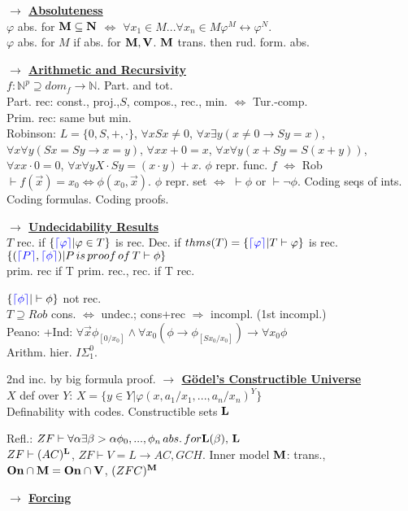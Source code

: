 \documentclass[9pt]{article}
\newcommand{\class}[1]{{\bf #1}}
\newcommand{\N}{\mathbb{N}}
\newcommand{\code}[1]{{\color{blue}\lceil#1\rceil}}
\newcommand{\mytitle}[1]{ {\bf $\rightarrow$ \underline{#1}}\\}
\begin{document}
\begin{multicols*}{2}
\mytitle{Absoluteness}
$\varphi$ abs. for $\class{M}\subseteq\class{N}$ $\Leftrightarrow$ $\forall x_1\in M...\forall x_n\in M \varphi^M\leftrightarrow\varphi^N$.\\
$\varphi$ abs. for $M$ if abs. for $\class{M}, \class{V}$.
$\class{M}$ trans. then rud. form. abs.

\mytitle{Arithmetic and Recursivity}
$f\colon \N^p\supseteq dom_f\to \N$. Part. and tot.\\
Part. rec: const., proj.,$S$, compos., rec., min. $\Leftrightarrow$ Tur.-comp.\\
Prim. rec: same but min.\\
Robinson: $L=\{0,S,+,\cdot\}$, $\forall x Sx\neq 0$, $\forall x\exists y (x\neq 0\to Sy=x)$, $\forall x \forall y (Sx=Sy\to x=y)$, $\forall x x+0=x$, $\forall x\forall y (x+Sy=S(x+y))$, $\forall x x\cdot 0=0$, $\forall x\forall y X\cdot Sy=(x\cdot y)+x$.
$\phi$ repr. func. $f$ $\Leftrightarrow$ Rob$\vdash f(\vec{x})=x_0\Leftrightarrow\phi(x_0,\vec{x})$. $\phi$ repr. set $\Leftrightarrow$ $\vdash\phi$ or $\vdash\neg\phi$. Coding seqs of ints. Coding formulas. Coding proofs.

\mytitle{Undecidability Results}
$T$ rec. if $\{\code{\varphi}|\varphi\in T\}$ is rec. Dec. if $thms(T)=\{\code{\varphi}|T\vdash\varphi\}$ is rec.\\
$\{(\code{P},\code{\phi})|P\,is\,proof\,of\,T\vdash\phi\}$\\
prim. rec if T prim. rec., rec. if T rec.

$\{\code{\phi}|\vdash\phi\}$ not rec.\\
$T\supseteq Rob$ cons. $\Leftrightarrow$ undec.; cons+rec $\Rightarrow$ incompl. (1st incompl.)\\
Peano: +Ind: $\forall \vec{x}\phi_{[0/x_0]}\wedge\forall x_0(\phi\to \phi_{[Sx_0/x_0]})\to\forall x_0\phi$\\
Arithm. hier. $I\Sigma_1^0$.

2nd inc. by big formula proof.
\mytitle{G\"odel's Constructible Universe}
$X$ def over $Y$: $X=\{y\in Y|\varphi(x,a_1/x_1,...,a_n/x_n)^Y\}$\\
Definability with codes. Constructible sets $\class{L}$

Refl.: $ZF\vdash \forall\alpha\exists\beta>\alpha \phi_0,...,\phi_n\,abs.\,for \class{L}(\beta),\,\class{L}$\\
$ZF\vdash (AC)^{\class{L}}$, $ZF\vdash V=L\to AC, GCH$.
Inner model $\class{M}$: trans., $\class{On}\cap\class{M}=\class{On}\cap\class{V}$, $(ZFC)^\class{M}$

\mytitle{Forcing}
\end{multicols*}
\end{document}
